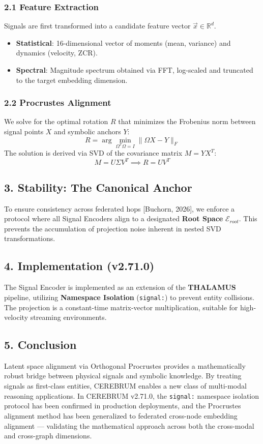 \subsubsection*{2.1 Feature Extraction}
Signals are first transformed into a candidate feature vector $\vec{x} \in \mathbb{R}^d$.
\begin{itemize}
  \item \textbf{Statistical}: 16-dimensional vector of moments (mean, variance) and dynamics (velocity, ZCR).
  \item \textbf{Spectral}: Magnitude spectrum obtained via FFT, log-scaled and truncated to the target embedding dimension.
\end{itemize}


\subsubsection*{2.2 Procrustes Alignment}
We solve for the optimal rotation $R$ that minimizes the Frobenius norm between signal points $X$ and symbolic anchors $Y$:
$$R = \arg\min_{\Omega^T\Omega=I} \| \Omega X - Y \|_F$$
The solution is derived via SVD of the covariance matrix $M = Y X^T$:
$$M = U \Sigma V^T \implies R = U V^T$$

\subsection*{3. Stability: The Canonical Anchor}
To ensure consistency across federated hops [Buchorn, 2026], we enforce a protocol where all Signal Encoders align to a designated \textbf{Root Space} $\mathcal{E}_{root}$. This prevents the accumulation of projection noise inherent in nested SVD transformations.

\subsection*{4. Implementation (v2.71.0)}
The Signal Encoder is implemented as an extension of the \textbf{THALAMUS} pipeline, utilizing \textbf{Namespace Isolation} (\texttt{signal:}) to prevent entity collisions. The projection is a constant-time matrix-vector multiplication, suitable for high-velocity streaming environments.

\subsection*{5. Conclusion}
Latent space alignment via Orthogonal Procrustes provides a mathematically robust bridge between physical signals and symbolic knowledge. By treating signals as first-class entities, CEREBRUM enables a new class of multi-modal reasoning applications. In CEREBRUM v2.71.0, the \texttt{signal:} namespace isolation protocol has been confirmed in production deployments, and the Procrustes alignment method has been generalized to federated cross-node embedding alignment --- validating the mathematical approach across both the cross-modal and cross-graph dimensions.

